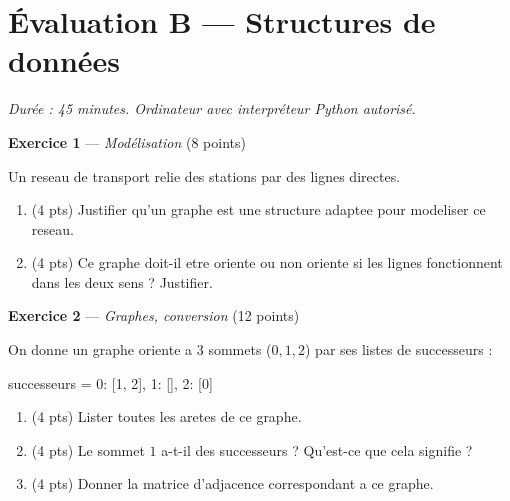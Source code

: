 \section*{Évaluation B --- Structures de données}
\textit{Durée : 45 minutes. Ordinateur avec interpréteur Python autorisé.}


\bigskip

\textbf{Exercice 1} --- \textit{Modélisation} \hfill (8 points)

Un reseau de transport relie des stations par des lignes directes.
\begin{enumerate}
  \item (4 pts) Justifier qu'un graphe est une structure adaptee pour modeliser ce reseau.
  \item (4 pts) Ce graphe doit-il etre oriente ou non oriente si les lignes fonctionnent dans les deux sens ? Justifier.
\end{enumerate}

\bigskip

\textbf{Exercice 2} --- \textit{Graphes, conversion} \hfill (12 points)

On donne un graphe oriente a $3$ sommets ($0,1,2$) par ses listes de successeurs :
\begin{python}
successeurs = {0: [1, 2], 1: [], 2: [0]}
\end{python}
\begin{enumerate}
  \item (4 pts) Lister toutes les aretes de ce graphe.
  \item (4 pts) Le sommet $1$ a-t-il des successeurs ? Qu'est-ce que cela signifie ?
  \item (4 pts) Donner la matrice d'adjacence correspondant a ce graphe.
\end{enumerate}


